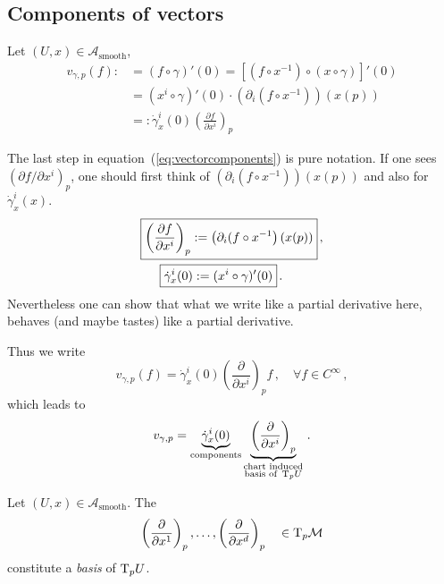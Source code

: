 \documentclass[11pt, a4paper, twocolumn]{article} %
\begin{document}
\subsection{Components of vectors}
Let $(U,x) \in \mathcal{A}_\text{smooth}$,
\begin{align}
    v_{\gamma,p}(f):&= (f\circ\gamma)'(0) = \left[ (f\circ x^{-1})\circ(x\circ\gamma) \right]'(0) \nonumber\\
    &= (x^i\circ\gamma)' (0) \cdot \left( \partial_i (f\circ x^{-1}) \right)\left( x(p) \right)\nonumber\\
    &=:\dot{\gamma}^i_x(0) \left(\frac{\partial f}{\partial x^i}\right)_p
    \label{eq:vectorcomponents}
\end{align}
\begin{note}
    The last step in equation~(\ref{eq:vectorcomponents}) is pure notation.
    If one sees $(\partial f / \partial x^i)_p$, one should first think of
    $\left( \partial_i (f\circ x^{-1}) \right)\left( x(p) \right)$ and also
    for $\dot{\gamma}^i_x(x)$.
    \begin{align}
        \Aboxed{%
            \left( \frac{\partial f}{\partial x^i} \right)_p &:= \left( \partial_i(f\circ x^{-1} \right)(x(p))}\,,\\
        \Aboxed{%
        \dot{\gamma}_x^i (0) &:= (x^i\circ\gamma)'(0)}\,.
        \label{eq:vectorcomponents2}
    \end{align}
    Nevertheless one can show that what we write like a partial derivative here,
    behaves (and maybe tastes) like a partial derivative.
\end{note}
Thus we write
\begin{equation}
    v_{\gamma,p}(f) = \dot{\gamma}^i_x(0)\left( \frac{\partial}{\partial x^i} \right)_p f\,,\quad\forall f\in C^\infty\,,
\end{equation}
which leads to
\begin{equation}
    v_{\gamma,p} = \underbrace{\dot{\gamma}^i_x(0)}_{\text{components}} 
\underbrace{\left( \frac{\partial}{\partial x^i} \right)_p}_{\substack{\text{chart induced} \\\text{basis of } \T_pU}}\,.
\end{equation}
\begin{theorem}
    Let $(U,x) \in \mathcal{A}_\text{smooth}$.
    The
    \begin{equation}
        \left( \frac{\partial}{\partial x^1} \right)_p, \ldots, \left( \frac{\partial}{\partial x^d} \right)_p \quad \in \T_p\M
    \end{equation}
    constitute a \textit{basis} of $\T_pU$.
\end{theorem}
\end{document}

